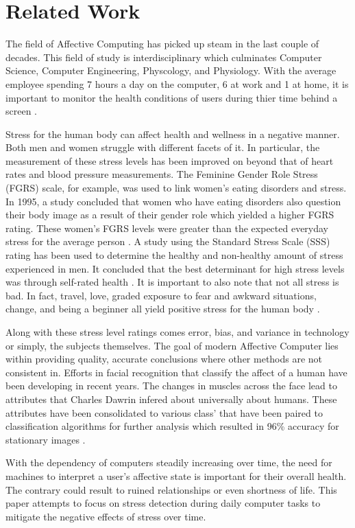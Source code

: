 \section{Related Work}
\label{sec:Related-Work}

The field of Affective Computing has picked up steam in the last couple of decades. 
This field of study is interdisciplinary which culminates Computer Science, Computer Engineering, Physcology, and 
Physiology. With the average employee spending 7 hours a day on the computer, 6 at work and 1 at home, 
it is important to monitor the health conditions of users during thier time behind a screen \cite{computer-time}.

Stress for the human body can affect health and wellness in a negative manner. Both men and women struggle with 
different facets of it. In particular, the measurement of these stress levels has been improved on beyond that of 
heart rates and blood pressure measurements. The Feminine Gender Role Stress (FGRS) scale, for example, 
was used to link women's eating disorders and stress. In 1995, a study concluded that 
women who have eating disorders also question their body image as a result of their gender role which yielded a 
higher FGRS rating. These women's FGRS levels were greater than the expected everyday stress for the average person 
\cite{eating-disorders}. A study using the Standard Stress Scale (SSS) rating has been used to determine the healthy 
and non-healthy amount of stress experienced in men. It concluded that the best determinant for 
high stress levels was through self-rated health \cite{stress-men}. 
It is important to also note that not all stress is bad. In fact, travel, love, graded exposure to fear and awkward 
situations, change, and being a beginner all yield positive stress for the human body \cite{good-stress}. 

Along with these stress level ratings comes error, bias, and variance in technology or simply, the subjects themselves.
The goal of modern Affective Computer lies within providing quality, accurate conclusions where other methods are not 
consistent in. Efforts in facial recognition that classify the affect of a human have been developing in recent 
years. The changes in muscles across the face lead to attributes that Charles Dawrin infered about universally about 
humans. These attributes have been consolidated to various class' that have been paired to classification algorithms 
for further analysis which resulted in 96\% accuracy for stationary images \cite{facial-recognition}. 

With the dependency of computers steadily increasing over time, the need for machines to interpret a user's affective state 
is important for their overall health. The contrary could result to ruined relationships or even shortness of life. 
This paper attempts to focus on stress detection during daily computer tasks to mitigate the negative effects of 
stress over time. 
